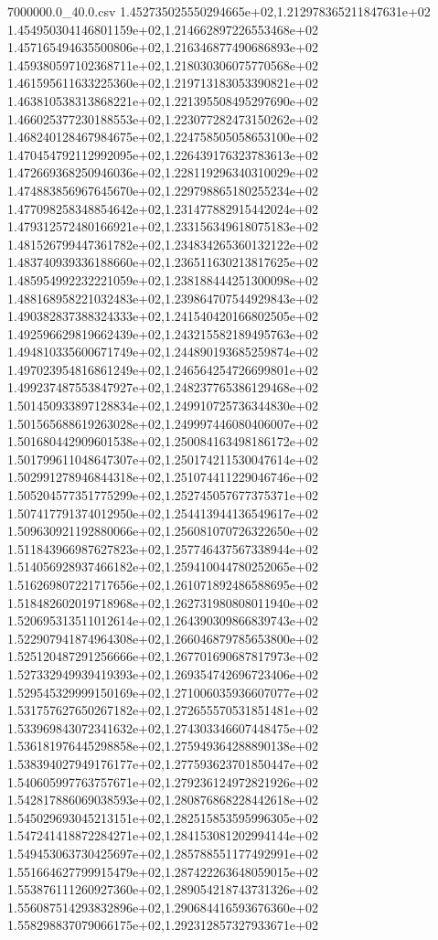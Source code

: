\begin{filecontents*}{7000000.0_40.0.csv}
1.452735025550294665e+02,1.212978365211847631e+02
1.454950304146801159e+02,1.214662897226553468e+02
1.457165494635500806e+02,1.216346877490686893e+02
1.459380597102368711e+02,1.218030306075770568e+02
1.461595611633225360e+02,1.219713183053390821e+02
1.463810538313868221e+02,1.221395508495297690e+02
1.466025377230188553e+02,1.223077282473150262e+02
1.468240128467984675e+02,1.224758505058653100e+02
1.470454792112992095e+02,1.226439176323783613e+02
1.472669368250946036e+02,1.228119296340310029e+02
1.474883856967645670e+02,1.229798865180255234e+02
1.477098258348854642e+02,1.231477882915442024e+02
1.479312572480166921e+02,1.233156349618075183e+02
1.481526799447361782e+02,1.234834265360132122e+02
1.483740939336188660e+02,1.236511630213817625e+02
1.485954992232221059e+02,1.238188444251300098e+02
1.488168958221032483e+02,1.239864707544929843e+02
1.490382837388324333e+02,1.241540420166802505e+02
1.492596629819662439e+02,1.243215582189495763e+02
1.494810335600671749e+02,1.244890193685259874e+02
1.497023954816861249e+02,1.246564254726699801e+02
1.499237487553847927e+02,1.248237765386129468e+02
1.501450933897128834e+02,1.249910725736344830e+02
1.501565688619263028e+02,1.249997446080406007e+02
1.501680442909601538e+02,1.250084163498186172e+02
1.501799611048647307e+02,1.250174211530047614e+02
1.502991278946844318e+02,1.251074411229046746e+02
1.505204577351775299e+02,1.252745057677375371e+02
1.507417791374012950e+02,1.254413944136549617e+02
1.509630921192880066e+02,1.256081070726322650e+02
1.511843966987627823e+02,1.257746437567338944e+02
1.514056928937466182e+02,1.259410044780252065e+02
1.516269807221717656e+02,1.261071892486588695e+02
1.518482602019718968e+02,1.262731980808011940e+02
1.520695313511012614e+02,1.264390309866839743e+02
1.522907941874964308e+02,1.266046879785653800e+02
1.525120487291256666e+02,1.267701690687817973e+02
1.527332949939419393e+02,1.269354742696723406e+02
1.529545329999150169e+02,1.271006035936607077e+02
1.531757627650267182e+02,1.272655570531851481e+02
1.533969843072341632e+02,1.274303346607448475e+02
1.536181976445298858e+02,1.275949364288890138e+02
1.538394027949176177e+02,1.277593623701850447e+02
1.540605997763757671e+02,1.279236124972821926e+02
1.542817886069038593e+02,1.280876868228442618e+02
1.545029693045213151e+02,1.282515853595996305e+02
1.547241418872284271e+02,1.284153081202994144e+02
1.549453063730425697e+02,1.285788551177492991e+02
1.551664627799915479e+02,1.287422263648059015e+02
1.553876111260927360e+02,1.289054218743731326e+02
1.556087514293832896e+02,1.290684416593676360e+02
1.558298837079066175e+02,1.292312857327933671e+02

\end{filecontents*}
